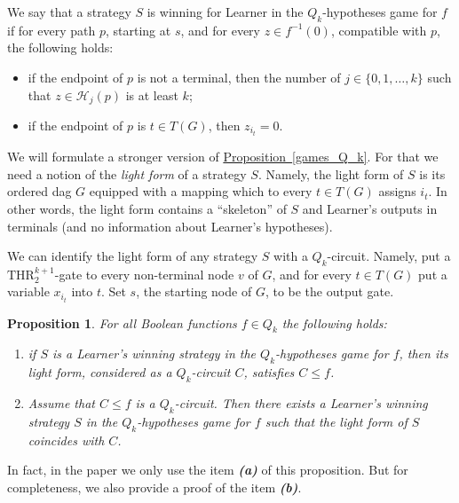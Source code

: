 \documentclass[11pt]{article}
\numberwithin{equation}{section}
\newtheorem{proposition}[theorem]{Proposition}
\theoremstyle{definition}
\theoremstyle{plain}
\newcommand{\expref}[2]{\hyperref[#2]{#1~\ref{#2}}}
\def\THR{\mathrm{THR}}
\begin{document}
We say that a strategy $S$ is winning for Learner in the $Q_k$-hypotheses game for $f$ if for every path $p$, starting at $s$, and for every $z\in f^{-1}(0)$, compatible with $p$, the following holds:
\begin{itemize}
\item if the endpoint of $p$ is not a terminal, then the number of $j\in\{0, 1, \ldots, k\}$ such that $z\in \mathcal{H}_j(p)$ is at least $k$;
\item if the endpoint of $p$ is $t\in T(G)$, then $z_{i_t} = 0$.
\end{itemize}
We will formulate a stronger version of \expref{Proposition}{games_Q_k}. For that we need a notion of the \emph{light form} of a strategy $S$. Namely, the light form of $S$ is its ordered dag $G$ equipped with a mapping which to every $t\in T(G)$ assigns $i_t$. In other words, the light form contains a ``skeleton'' of $S$ and Learner's outputs in terminals (and no information about Learner's hypotheses). 

We can identify the light form of any strategy $S$ with a $Q_k$-circuit. Namely, put a $\THR^{k + 1}_2$-gate to every non-terminal node $v$ of $G$, and for every $t\in T(G)$ put a variable $x_{i_t}$ into $t$.
Set $s$, the starting node of $G$, to be %
the output gate. 

\begin{proposition}
\label{Q_k_equivalence}
For all Boolean functions $f\in Q_k$ the following holds:
\begin{enumerate}[label=(\alph*)]
\item if $S$ is a Learner's winning strategy in the $Q_k$-hypotheses game for $f$, then its light form, considered as a $Q_k$-circuit $C$, satisfies $C\le f$.


\item  Assume that $C\le f$ is a $Q_k$-circuit. Then there exists a Learner's winning strategy $S$ in the $Q_k$-hypotheses game for $f$ such that the light form of $S$ coincides with $C$.
\end{enumerate}
\end{proposition} 

In fact, in the paper  we only use the item \textbf{\emph{(a)}} of this proposition. But for completeness, we also provide a proof of the item \textbf{\emph{(b)}}.
\end{document}
